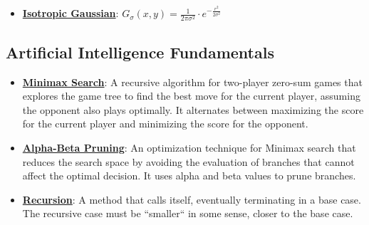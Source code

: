 \documentclass{article}%
\begin{document}
\begin{itemize}[leftmargin=*]
\item \href{https://purdue.brightspace.com/d2l/common/assets/pdfjs-d2l-dist/1.0.14-legacy/web/viewer.html?file=\%2Fcontent\%2Fenforced\%2F1095467-wl.202510.CS.24300.001\%2F08L2-Feature Extraction.pdf\%3Fou\%3D1095467\&lang=en-us\&container=d2l-fileviewer-rendered-pdf\&fullscreen=d2l-fileviewer-rendered-pdf-dialog\&height=667#page=43}{\textbf{Isotropic Gaussian}}: $G_\sigma(x, y) = \frac{1}{2\pi\sigma^2} \cdot e^{-\frac{r^2}{2\sigma^2}}$%
\end{itemize}

%
\subsection{Artificial Intelligence Fundamentals}%
\label{subsec:ArtificialIntelligenceFundamentals}%
\begin{itemize}[leftmargin=*]%
\item \href{https://purdue.brightspace.com/d2l/common/assets/pdfjs-d2l-dist/1.0.14-legacy/web/viewer.html?file=\%2Fcontent\%2Fenforced\%2F1095467-wl.202510.CS.24300.001\%2F02L2-Intro.pdf\%3Fou\%3D1095467\&lang=en-us\&container=d2l-fileviewer-rendered-pdf\&fullscreen=d2l-fileviewer-rendered-pdf-dialog\&height=667#page=22}{\textbf{Minimax Search}}: A recursive algorithm for two-player zero-sum games that explores the game tree to find the best move for the current player, assuming the opponent also plays optimally. It alternates between maximizing the score for the current player and minimizing the score for the opponent.%
\item \href{https://purdue.brightspace.com/d2l/common/assets/pdfjs-d2l-dist/1.0.14-legacy/web/viewer.html?file=\%2Fcontent\%2Fenforced\%2F1095467-wl.202510.CS.24300.001\%2F02L2-Intro.pdf\%3Fou\%3D1095467\&lang=en-us\&container=d2l-fileviewer-rendered-pdf\&fullscreen=d2l-fileviewer-rendered-pdf-dialog\&height=667#page=23}{\textbf{Alpha-Beta Pruning}}: An optimization technique for Minimax search that reduces the search space by avoiding the evaluation of branches that cannot affect the optimal decision. It uses alpha and beta values to prune branches.%
\item \href{https://purdue.brightspace.com/d2l/common/assets/pdfjs-d2l-dist/1.0.14-legacy/web/viewer.html?file=\%2Fcontent\%2Fenforced\%2F1095467-wl.202510.CS.24300.001\%2F14L1-DepthFS.pdf\%3Fou\%3D1095467\&lang=en-us\&container=d2l-fileviewer-rendered-pdf\&fullscreen=d2l-fileviewer-rendered-pdf-dialog\&height=667#page=3}{\textbf{Recursion}}: A method that calls itself, eventually terminating in a base case. The recursive case must be ``smaller`` in some sense, closer to the base case.%

\end{itemize}
\end{document}
